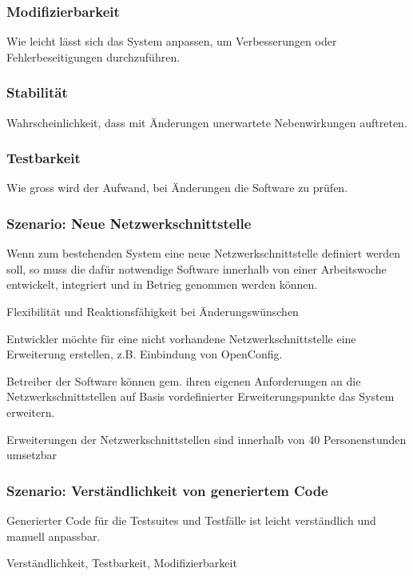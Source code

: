 \documentclass[
	ngerman,
	toc=listof, %
	toc=bibliography, %
	footnotes=multiple, %
	parskip=half, %
	numbers=noendperiod %
]{scrartcl}
\begin{document}
		\subsubsection{Modifizierbarkeit}
			Wie leicht lässt sich das System anpassen, um Verbesserungen oder Fehlerbeseitigungen durchzuführen.

		\subsubsection{Stabilität}
			Wahrscheinlichkeit, dass mit Änderungen unerwartete Nebenwirkungen auftreten.

		\subsubsection{Testbarkeit}
			Wie gross wird der Aufwand, bei Änderungen die Software zu prüfen.

		\subsubsection{Szenario: Neue Netzwerkschnittstelle}
			Wenn zum bestehenden System eine neue Netzwerkschnittstelle definiert werden soll, so muss die dafür notwendige Software innerhalb von einer Arbeitswoche entwickelt, integriert und in Betrieg genommen werden können.

				Flexibilität und Reaktionsfähigkeit bei Änderungswünschen

				Entwickler möchte für eine nicht vorhandene Netzwerkschnittstelle eine Erweiterung erstellen, z.B. Einbindung von OpenConfig.

				Betreiber der Software können gem. ihren eigenen Anforderungen an die Netzwerkschnittstellen auf Basis vordefinierter Erweiterungspunkte das System erweitern.

				Erweiterungen der Netzwerkschnittstellen sind innerhalb von 40 Personenstunden umsetzbar

		\subsubsection{Szenario: Verständlichkeit von generiertem Code}
			Generierter Code für die Testsuites und Testfälle ist leicht verständlich und manuell anpassbar.

				Verständlichkeit, Testbarkeit, Modifizierbarkeit
\end{document}
